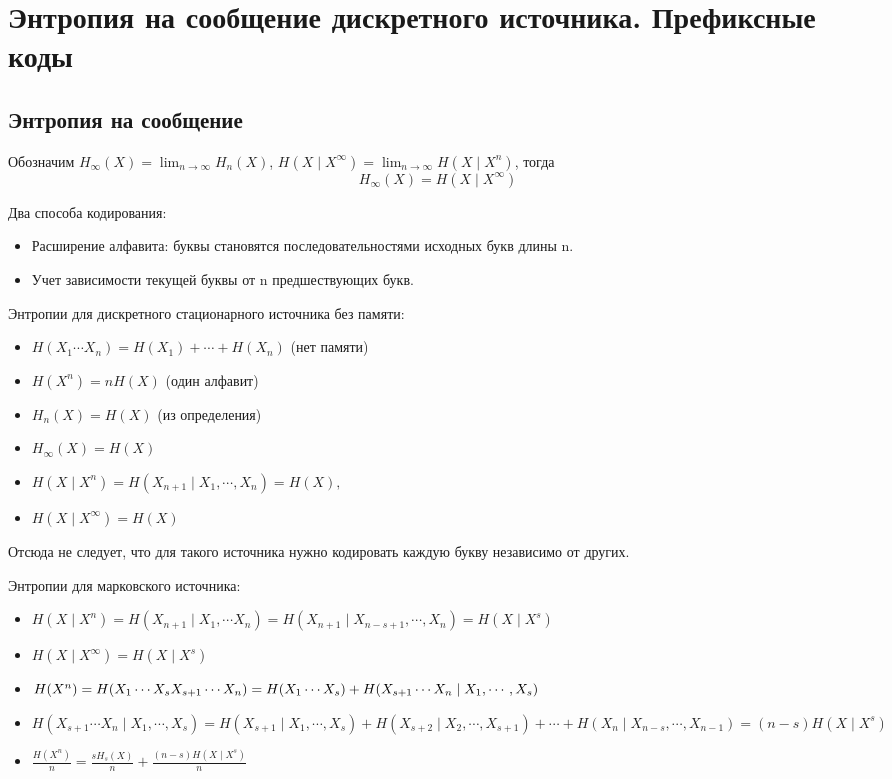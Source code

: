 \section{Энтропия на сообщение дискретного источника. Префиксные коды}

\subsection{Энтропия на сообщение}

Обозначим $H_\infty(X) = \lim_{n \to \infty} H_n(X)$, $H(X \mid X^\infty) = \lim_{n
\to \infty} H(X \mid X^n)$, тогда
\[
    H_\infty (X) = H(X \mid X^\infty)
\]

Два способа кодирования:
\begin{itemize}
    \item Расширение алфавита: буквы становятся последовательностями исходных букв длины
        n.
    \item Учет зависимости текущей буквы от n предшествующих букв.
\end{itemize}

Энтропии для дискретного стационарного источника без памяти:
\begin{itemize}
    \item $H(X_1 \cdots X_n) = H(X_1) + \cdots + H(X_n)$ (нет памяти)
    \item $H(X^n) = nH(X)$ (один алфавит)
    \item $H_n(X) = H(X)$ (из определения)
    \item $H_\infty(X) = H(X)$
    \item $H(X \mid X^n) = H(X_{n+1} \mid X_1, \cdots, X_n) = H(X),$
    \item $H(X \mid X^\infty) = H(X)$
\end{itemize}

Отсюда не следует, что для такого источника нужно кодировать каждую букву
независимо от других.

Энтропии для марковского источника:
\begin{itemize}
    \item $H(X \mid X^n) = H(X_{n+1} \mid X_1, \cdots X_n) = H(X_{n+1} \mid X_{n
        - s + 1}, \cdots, X_n) = H(X \mid X^s)$
    \item $H(X \mid X^\infty) = H(X \mid X^s)$
    \item $H(X^n) = H(X_1 \cdots X_s X_{s + 1} \cdots X_n) \\
        = H(X_1 \cdots X_s) + H(X_{s+1} \cdots X_n \mid X_1, \cdots, X_s)$
    \item $H(X_{s+1} \cdots X_n \mid X_1, \cdots, X_s) = H(X_{s+1} \mid X_1,
        \cdots, X_{s}) + H(X_{s+2} \mid X_2, \cdots, X_{s+1}) + \cdots + H(X_n
        \mid X_{n-s}, \cdots, X_{n-1}) = (n-s)H(X \mid X^s)$
    \item $\frac{H(X^n)}{n} = \frac{sH_s(X)}{n} + \frac{(n - s)H(X \mid X^s)}{n}$
\end{itemize}

